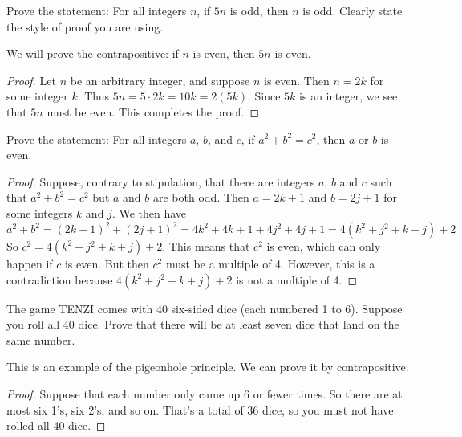 \begin{questions}
 
   
   
\question Prove the statement: For all integers $n$, if $5n$ is odd, then $n$ is odd.  Clearly state the style of proof you are using.
	\begin{answer}
	We will prove the contrapositive: if $n$ is even, then $5n$ is even.
	  \begin{proof}
	    Let $n$ be an arbitrary integer, and suppose $n$ is even.  Then $n = 2k$ for some integer $k$.  Thus $5n = 5\cdot 2k = 10k = 2(5k)$.  Since $5k$ is an integer, we see that $5n$ must be even.  This completes the proof.
	  \end{proof}
	
	\end{answer}




\question Prove the statement: For all integers $a$, $b$, and $c$, if $a^2 + b^2 = c^2$, then $a$ or $b$ is even. 
	\begin{answer}
	  \begin{proof}
	    Suppose, contrary to stipulation, that there are integers $a$, $b$ and $c$ such that $a^2 + b^2 = c^2$ but $a$ and $b$ are both odd.  Then $a = 2k+1$ and $b = 2j + 1$ for some integers $k$ and $j$.  We then have
	    \[a^2 + b^2 = (2k+1)^2 + (2j+1)^2 = 4k^2 + 4k + 1 + 4j^2 + 4j + 1 = 4(k^2 + j^2 + k + j) + 2\]
	    So $c^2 = 4(k^2 + j^2 + k + j) + 2$.  This means that $c^2$ is even, which can only happen if $c$ is even.  But then $c^2$ must be a multiple of 4.  However, this is a contradiction because $4(k^2 + j^2 + k + j) + 2$ is not a multiple of 4.
	  \end{proof}
	
	\end{answer}
 



\question The game TENZI comes with 40 six-sided dice (each numbered 1 to 6).  Suppose you roll all 40 dice.  Prove that there will be at least seven dice that land on the same number.

	\begin{answer}
	This is an example of the pigeonhole principle.  We can prove it by contrapositive.
	
	\begin{proof}
	Suppose that each number only came up 6 or fewer times.  So there are at most six 1's, six 2's, and so on.  That's a total of 36 dice, so you must not have rolled all 40 dice.
	\end{proof}
	\end{answer}






\end{questions}
